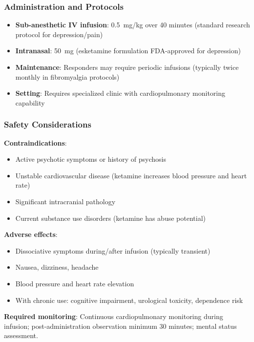 \subsubsection{Administration and Protocols}

\begin{itemize}
    \item \textbf{Sub-anesthetic IV infusion}: 0.5~mg/kg over 40 minutes (standard research protocol for depression/pain)
    \item \textbf{Intranasal}: 50~mg (esketamine formulation FDA-approved for depression)
    \item \textbf{Maintenance}: Responders may require periodic infusions (typically twice monthly in fibromyalgia protocols)
    \item \textbf{Setting}: Requires specialized clinic with cardiopulmonary monitoring capability
\end{itemize}

\subsubsection{Safety Considerations}

\begin{warning}
\textbf{Contraindications}:
\begin{itemize}
    \item Active psychotic symptoms or history of psychosis
    \item Unstable cardiovascular disease (ketamine increases blood pressure and heart rate)
    \item Significant intracranial pathology
    \item Current substance use disorders (ketamine has abuse potential)
\end{itemize}
\textbf{Adverse effects}:
\begin{itemize}
    \item Dissociative symptoms during/after infusion (typically transient)
    \item Nausea, dizziness, headache
    \item Blood pressure and heart rate elevation
    \item With chronic use: cognitive impairment, urological toxicity, dependence risk
\end{itemize}
\textbf{Required monitoring}: Continuous cardiopulmonary monitoring during infusion; post-administration observation minimum 30 minutes; mental status assessment.
\end{warning}

